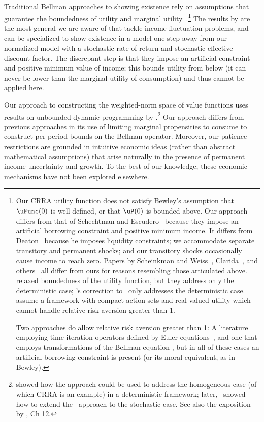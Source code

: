 \documentclass[BufferStockTheory]{subfiles}
\begin{document}
Traditional Bellman approaches to showing existence rely on assumptions that guarantee the boundedness of utility and marginal utility~\citep{slpMethods}.\footnote{Our CRRA utility function does not satisfy Bewley's assumption that $\uFunc(0)$ is well-defined, or that $\uP(0)$ is bounded above. %
  Our approach differs from that of Schechtman and Escudero~\citeyearpar{seIncFluct} because they impose an artificial borrowing constraint and positive minimum income.
  It differs from Deaton~\citeyearpar{deatonLiqConstr} because he imposes liquidity constraints; we accommodate separate transitory and permanent shocks; and our transitory shocks occasionally cause income to reach zero.
  Papers by Scheinkman and Weiss~\citeyearpar{scheinkman&weiss:borrowing}, Clarida~\citep{claridaErgodic}, and others~\cite{cwcUnderUncert} all differ from ours for reasons resembling those articulated above.
  \cite{asHomogeneous} relaxed boundedness of the utility function, but they address only the deterministic case; \cite{mvExistence}'s correction to~\cite{rrExistence} only addresses the deterministic case.
  \cite{mnUnique} assume a framework with compact action sets and real-valued utility which cannot handle relative risk aversion greater than 1. %
  
  Two approaches do allow relative risk aversion greater than 1:  A literature employing time iteration operators defined by Euler equations~\citep{deatonLiqConstr, lsIncFluct, mstIncFluct}, and one that employs transformations of the Bellman equation \citep{rinconZapatero2024}, but in all of these cases an artificial borrowing constraint is present (or its moral equivalent, as in Bewley). %
}
The results by \cite{mstIncFluct,maUnboundedDP} are the most general we are aware of that tackle income fluctuation problems, and can be specialized to show existence in a model one step away from our normalized model with a stochastic rate of return and stochastic effective discount factor. The discrepant step is that they impose an artificial constraint and positive minimum value of income; this bounds utility from below (it can never be lower than the marginal utility of consumption) and thus cannot be applied here.

Our approach to constructing the weighted-norm space of value functions uses results on unbounded dynamic programming by \citep{jboydWeighted}.\footnote{\cite{asHomogeneous} showed how the approach could be used to address the homogeneous case (of which CRRA is an example) in a deterministic framework; later,~\cite{duranDiscounting} showed how to extend the~\cite{jboydWeighted} approach to the stochastic case.
  See also the exposition by \cite{stachurski2022}, Ch 12.} Our approach differs from previous approaches in its use of limiting marginal propensities to consume to construct per-period bounds on the Bellman operator.
Moreover, our patience restrictions are grounded in intuitive economic ideas (rather than abstract mathematical assumptions) that arise naturally in the presence of permanent income uncertainty and growth.
To the best of our knowledge, these economic mechanisms have not been explored elsewhere.
\end{document}
